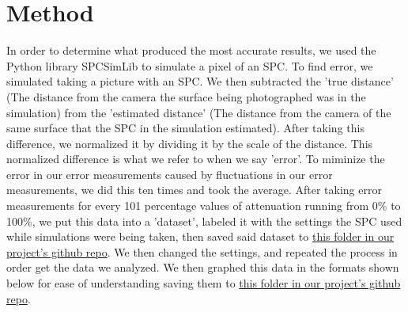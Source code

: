 \documentclass{article}
\begin{document}
\section*{Method}
In order to determine what produced the most accurate results, we used the Python library SPCSimLib \cite{spc} to simulate a pixel of an SPC. To find error, we simulated taking a picture with an SPC. We then subtracted the 'true distance' (The distance from the camera the surface being photographed was in the simulation) from the 'estimated distance' (The distance from the camera of the same surface that the SPC in the simulation estimated). After taking this difference, we normalized it by dividing it by the scale of the distance. This normalized difference is what we refer to when we say 'error'. To miminize the error in our error measurements caused by fluctuations in our error measurements, we did this ten times and took the average. After taking error measurements for every 101 percentage values of attenuation running from 0\% to 100\%, we put this data into a 'dataset', labeled it with the settings the SPC used while simulations were being taken, then saved said dataset to \href{https://github.com/yggaraxyg/SPCErrorLowerer/tree/master/RunData/runDataUsedInInitialProject}{this folder in our project's github repo}. We then changed the settings, and repeated the process in order get the data we analyzed. We then graphed this data in the formats shown below for ease of understanding saving them to \href{https://github.com/yggaraxyg/SPCErrorLowerer/tree/master/Graphs}{this folder in our project's github repo}.
\end{document}
